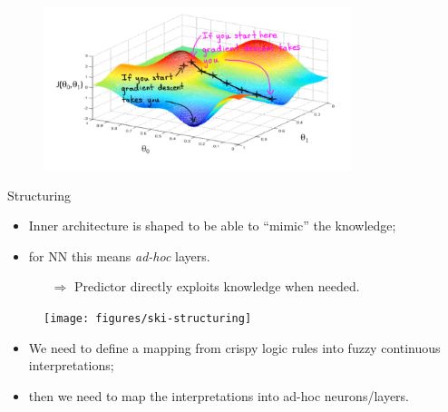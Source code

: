 \documentclass[presentation]{beamer}\mode<presentation>{\usetheme{AMSBolognaFC}}
\begin{document}
\begin{frame}[allowframebreaks]{\skilong}
{        \framebreak
        
        \begin{figure}
            \centering
            \includegraphics[width=0.8\textwidth]{figures/nn-gradient-descent.png}
        \end{figure}
        
        \framebreak
        
        \begin{block}{Structuring}
            \begin{itemize}
                \item Inner architecture is shaped to be able to ``mimic'' the knowledge;
                \item for NN this means \emph{ad-hoc} layers.
                \begin{itemize}
                    \item[$\Rightarrow$] Predictor directly exploits knowledge when needed.
                \end{itemize} 
            \end{itemize}
        \end{block}
        
        \begin{figure}
            \centering
            \texttt{[image: figures/ski-structuring]}
        \end{figure}
        
        \framebreak
        
        \begin{itemize}
            \item We need to define a mapping from crispy logic rules into fuzzy continuous interpretations;
            \item then we need to map the interpretations into ad-hoc neurons/layers.
        \end{itemize}
        
}
\end{frame}
\end{document}
